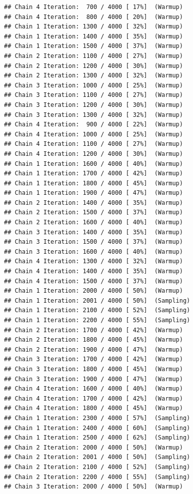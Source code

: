 \documentclass[
]{article}
\begin{document}
\begin{verbatim}
## Chain 4 Iteration:  700 / 4000 [ 17%]  (Warmup) 
## Chain 4 Iteration:  800 / 4000 [ 20%]  (Warmup) 
## Chain 1 Iteration: 1300 / 4000 [ 32%]  (Warmup) 
## Chain 1 Iteration: 1400 / 4000 [ 35%]  (Warmup) 
## Chain 1 Iteration: 1500 / 4000 [ 37%]  (Warmup) 
## Chain 2 Iteration: 1100 / 4000 [ 27%]  (Warmup) 
## Chain 2 Iteration: 1200 / 4000 [ 30%]  (Warmup) 
## Chain 2 Iteration: 1300 / 4000 [ 32%]  (Warmup) 
## Chain 3 Iteration: 1000 / 4000 [ 25%]  (Warmup) 
## Chain 3 Iteration: 1100 / 4000 [ 27%]  (Warmup) 
## Chain 3 Iteration: 1200 / 4000 [ 30%]  (Warmup) 
## Chain 3 Iteration: 1300 / 4000 [ 32%]  (Warmup) 
## Chain 4 Iteration:  900 / 4000 [ 22%]  (Warmup) 
## Chain 4 Iteration: 1000 / 4000 [ 25%]  (Warmup) 
## Chain 4 Iteration: 1100 / 4000 [ 27%]  (Warmup) 
## Chain 4 Iteration: 1200 / 4000 [ 30%]  (Warmup) 
## Chain 1 Iteration: 1600 / 4000 [ 40%]  (Warmup) 
## Chain 1 Iteration: 1700 / 4000 [ 42%]  (Warmup) 
## Chain 1 Iteration: 1800 / 4000 [ 45%]  (Warmup) 
## Chain 1 Iteration: 1900 / 4000 [ 47%]  (Warmup) 
## Chain 2 Iteration: 1400 / 4000 [ 35%]  (Warmup) 
## Chain 2 Iteration: 1500 / 4000 [ 37%]  (Warmup) 
## Chain 2 Iteration: 1600 / 4000 [ 40%]  (Warmup) 
## Chain 3 Iteration: 1400 / 4000 [ 35%]  (Warmup) 
## Chain 3 Iteration: 1500 / 4000 [ 37%]  (Warmup) 
## Chain 3 Iteration: 1600 / 4000 [ 40%]  (Warmup) 
## Chain 4 Iteration: 1300 / 4000 [ 32%]  (Warmup) 
## Chain 4 Iteration: 1400 / 4000 [ 35%]  (Warmup) 
## Chain 4 Iteration: 1500 / 4000 [ 37%]  (Warmup) 
## Chain 1 Iteration: 2000 / 4000 [ 50%]  (Warmup) 
## Chain 1 Iteration: 2001 / 4000 [ 50%]  (Sampling) 
## Chain 1 Iteration: 2100 / 4000 [ 52%]  (Sampling) 
## Chain 1 Iteration: 2200 / 4000 [ 55%]  (Sampling) 
## Chain 2 Iteration: 1700 / 4000 [ 42%]  (Warmup) 
## Chain 2 Iteration: 1800 / 4000 [ 45%]  (Warmup) 
## Chain 2 Iteration: 1900 / 4000 [ 47%]  (Warmup) 
## Chain 3 Iteration: 1700 / 4000 [ 42%]  (Warmup) 
## Chain 3 Iteration: 1800 / 4000 [ 45%]  (Warmup) 
## Chain 3 Iteration: 1900 / 4000 [ 47%]  (Warmup) 
## Chain 4 Iteration: 1600 / 4000 [ 40%]  (Warmup) 
## Chain 4 Iteration: 1700 / 4000 [ 42%]  (Warmup) 
## Chain 4 Iteration: 1800 / 4000 [ 45%]  (Warmup) 
## Chain 1 Iteration: 2300 / 4000 [ 57%]  (Sampling) 
## Chain 1 Iteration: 2400 / 4000 [ 60%]  (Sampling) 
## Chain 1 Iteration: 2500 / 4000 [ 62%]  (Sampling) 
## Chain 2 Iteration: 2000 / 4000 [ 50%]  (Warmup) 
## Chain 2 Iteration: 2001 / 4000 [ 50%]  (Sampling) 
## Chain 2 Iteration: 2100 / 4000 [ 52%]  (Sampling) 
## Chain 2 Iteration: 2200 / 4000 [ 55%]  (Sampling) 
## Chain 3 Iteration: 2000 / 4000 [ 50%]  (Warmup) 

\end{verbatim}
\end{document}
